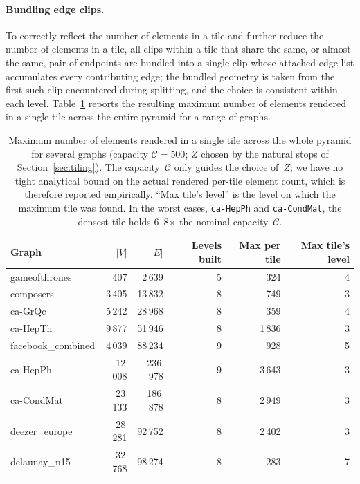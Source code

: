 \documentclass[a4paper,USenglish,anonymous]{gd-lipics-v3}
\begin{document}
\paragraph{Bundling edge clips.}
To correctly reflect the number of elements in a tile and further
reduce the number of elements in a tile, all clips within a tile that
share the same, or almost the same, pair of endpoints are bundled into
a single clip whose attached edge list accumulates every contributing
edge; the bundled geometry is taken from the first such clip
encountered during splitting, and the choice is consistent within each
level. Table~\ref{tab:max-per-tile} reports the resulting maximum
number of elements rendered in a single tile across the entire pyramid
for a range of graphs.

\begin{table}[t]
\caption{Maximum number of elements rendered in a single tile across
  the whole pyramid for several graphs (capacity $\mathcal{C}=500$;
  $Z$ chosen by the natural stops of
  Section~\ref{sec:tiling}). The capacity~$\mathcal{C}$ only guides
  the choice of~$Z$; we have no tight analytical bound on the actual
  rendered per-tile element count, which is therefore reported
  empirically. ``Max tile's level'' is the level on which the maximum
  tile was found. In the worst cases, \texttt{ca-HepPh} and
  \texttt{ca-CondMat}, the densest tile holds 6--8$\times$ the
  nominal capacity~$\mathcal{C}$.}
\label{tab:max-per-tile}
\centering
\begin{tabular}{lrrrrr}
\toprule
Graph & $|V|$ & $|E|$ & Levels built & Max per tile & Max tile's level \\
\midrule
gameofthrones      &     407 &   2\,639 & 5 &     324 & 4 \\
composers          &  3\,405 &  13\,832 & 8 &     749 & 3 \\
ca-GrQc            &  5\,242 &  28\,968 & 8 &     359 & 4 \\
ca-HepTh           &  9\,877 &  51\,946 & 8 &  1\,836 & 3 \\
facebook\_combined &  4\,039 &  88\,234 & 9 &     928 & 5 \\
ca-HepPh           & 12\,008 & 236\,978 & 9 &  3\,643 & 3 \\
ca-CondMat         & 23\,133 & 186\,878 & 8 &  2\,949 & 3 \\
deezer\_europe     & 28\,281 &  92\,752 & 8 &  2\,402 & 3 \\
delaunay\_n15      & 32\,768 &  98\,274 & 8 &     283 & 7 \\
\bottomrule
\end{tabular}
\end{table}
\end{document}
